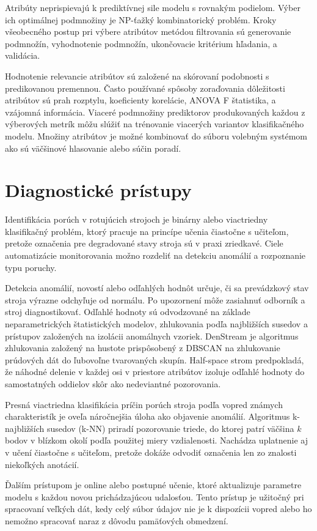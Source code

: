 Atribúty neprispievajú k prediktívnej sile modelu s rovnakým podielom. Výber ich optimálnej podmnožiny je NP-ťažký kombinatorický problém. Kroky všeobecného postup pri výbere atribútov metódou filtrovania sú generovanie podmnožín, vyhodnotenie podmnožín, ukončovacie kritérium hľadania, a validácia.

Hodnotenie relevancie atribútov sú založené na skórovaní podobnosti s predikovanou premennou. Často používané spôsoby zoraďovania dôležitosti atribútov sú prah rozptylu, koeficienty korelácie, ANOVA F štatistika, a vzájomná informácia. Viaceré podmnožiny prediktorov produkovaných každou z výberových metrík môžu slúžiť na trénovanie viacerých variantov klasifikačného modelu. Množiny atribútov je možné kombinovať do súboru volebným systémom ako sú väčšinové hlasovanie alebo súčin poradí.

\section{Diagnostické prístupy}
Identifikácia porúch v rotujúcich strojoch je binárny alebo viactriedny klasifikačný problém, ktorý pracuje na princípe učenia čiastočne s učiteľom, pretože označenia pre degradované stavy stroja sú v praxi zriedkavé. Ciele automatizácie monitorovania možno rozdeliť na detekciu anomálií a rozpoznanie typu poruchy.

Detekcia anomálií, novostí alebo odľahlých hodnôt určuje, či sa prevádzkový stav stroja výrazne odchyľuje od normálu. Po upozornení môže zasiahnuť odborník a stroj diagnostikovať. Odľahlé hodnoty sú odvodzované na základe neparametrických štatistických modelov, zhlukovania podľa najbližších susedov a prístupov založených na izolácii anomálnych vzoriek. DenStream je algoritmus zhlukovania založený na hustote prispôsobený z DBSCAN na zhlukovanie prúdových dát do ľubovoľne tvarovaných skupín. Half-space strom predpokladá, že náhodné delenie v každej osi v priestore atribútov izoluje odľahlé hodnoty do samostatných oddielov skôr ako nedeviantné pozorovania. 

Presná viactriedna klasifikácia príčin porúch stroja podľa vopred známych charakteristík je oveľa náročnejšia úloha ako objavenie anomálií. Algoritmus k-najbližších susedov (k-NN) priradí pozorovanie triede, do ktorej patrí väčšina $k$ bodov v blízkom okolí podľa použitej miery vzdialenosti. Nachádza uplatnenie aj v učení čiastočne s učiteľom, pretože dokáže odvodiť označenia len zo znalosti niekoľkých anotácií.

Ďalším prístupom je online alebo postupné učenie, ktoré aktualizuje parametre modelu s každou novou prichádzajúcou udalosťou. Tento prístup je užitočný pri spracovaní veľkých dát, kedy celý súbor údajov nie je k dispozícii vopred alebo ho nemožno spracovať naraz z dôvodu pamäťových obmedzení.

